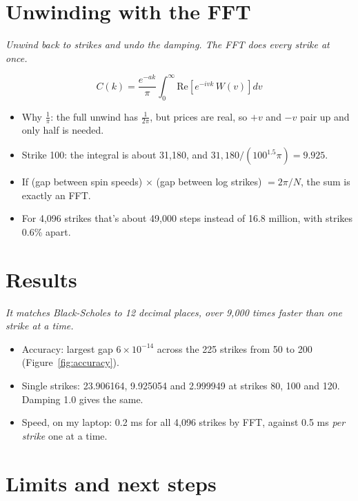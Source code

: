 \documentclass[10pt,a4paper]{article}
\newcommand{\lead}[1]{{\itshape\fontsize{11}{14}\selectfont\color{accent}#1}\par\vspace{1pt}}
\begin{document}
\section{Unwinding with the FFT}

\lead{Unwind back to strikes and undo the damping. The FFT does every strike at once.}

\[ C(k) = \frac{e^{-ak}}{\pi}\int_0^{\infty}\text{Re}\left[e^{-ivk}\, W(v)\right] dv \]
\begin{itemize}
\item Why $\frac{1}{\pi}$: the full unwind has $\frac{1}{2\pi}$, but prices are real, so $+v$ and $-v$ pair
up and only half is needed.
\item Strike 100: the integral is about 31,180, and $31{,}180 / (100^{1.5}\pi) = 9.925$.
\item If (gap between spin speeds) $\times$ (gap between log strikes) $= 2\pi/N$, the sum is exactly an FFT.
\item For 4,096 strikes that's about 49,000 steps instead of 16.8 million, with strikes 0.6\% apart.
\end{itemize}

\section{Results}

\lead{It matches Black-Scholes to 12 decimal places, over 9,000 times faster than one strike at a time.}

\begin{itemize}
\item Accuracy: largest gap $6\times10^{-14}$ across the 225 strikes from 50 to 200 (Figure~\ref{fig:accuracy}).
\item Single strikes: 23.906164, 9.925054 and 2.999949 at strikes 80, 100 and 120. Damping 1.0 gives the same.
\item Speed, on my laptop: 0.2 ms for all 4,096 strikes by FFT, against 0.5 ms \emph{per strike} one at a time.
\end{itemize}

\section{Limits and next steps}
\end{document}
